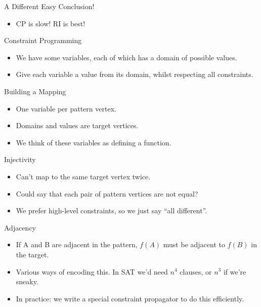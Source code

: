 \documentclass[aspectratio=169,compress,10pt]{beamer}
\begin{document}
\begin{frame}{A Different Easy Conclusion!}
    \begin{itemize}
        \item CP is slow! RI is best!
    \end{itemize}
\end{frame}

\begin{frame}{Constraint Programming}
    \begin{itemize}
        \item We have some \textcolor{uofgcobalt}{variables}, each of which has a
            \textcolor{uofgcobalt}{domain} of possible \textcolor{uofgcobalt}{values}.
        \item Give each variable a value from its domain, whilst respecting all
            \textcolor{uofgcobalt}{constraints}.
    \end{itemize}
\end{frame}

\begin{frame}{Building a Mapping}
    \begin{itemize}
        \item One variable per pattern vertex.
        \item Domains and values are target vertices.
        \item We think of these variables as defining a function.
    \end{itemize}
\end{frame}

\begin{frame}{Injectivity}
    \begin{itemize}
        \item Can't map to the same target vertex twice.
        \item Could say that each pair of pattern vertices are not equal?
        \item <2-> We prefer high-level constraints, so we just say ``all different''.
    \end{itemize}
\end{frame}

\begin{frame}{Adjacency}
    \begin{itemize}
        \item If A and B are adjacent in the pattern, $f(A)$ must be adjacent to $f(B)$
            in the target.
        \item Various ways of encoding this. In SAT we'd need $n^4$ clauses, or $n^3$ if
            we're sneaky.
        \item In practice: we write a special constraint propagator to do this efficiently.
    \end{itemize}
\end{frame}
\end{document}
